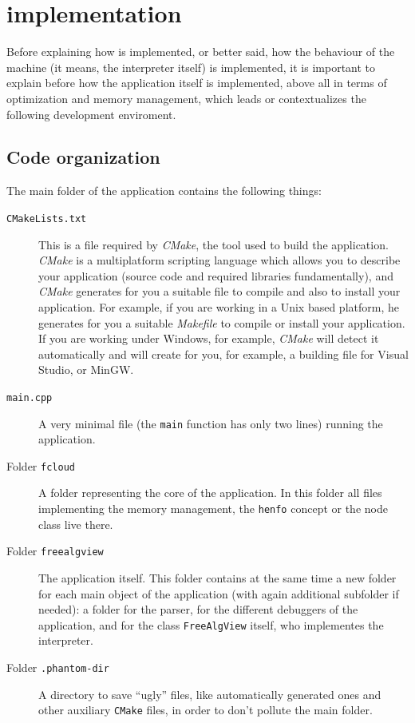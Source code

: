 \documentclass{article}
\begin{document}
\section{\fav implementation}
Before explaining how is \faupp implemented, or better said, how the behaviour
of the \faupp machine (it means, the interpreter itself) is implemented, it is
important to explain before how the application itself is implemented, above all
in terms of optimization and memory management, which leads or contextualizes
the following development enviroment.

\subsection{Code organization}
The main folder of the application contains the following things:

\begin{description}
  \item[\texttt{CMakeLists.txt}] This is a file required by \textit{CMake}, the tool used
    to build the application. \textit{CMake} is a multiplatform scripting language
    which allows you to describe your application (source code and required
    libraries fundamentally), and \textit{CMake} generates for you a suitable file
    to compile and also to install your application. For example, if you are
    working in a Unix based platform, he generates for you a suitable
    \textit{Makefile} to compile or install your application. If you are working
    under Windows, for example, \textit{CMake} will detect it automatically and
    will create for you, for example, a building file for Visual Studio, or
    MinGW.
  \item[\texttt{main.cpp}] A very minimal file (the \texttt{main} function has only two
    lines) running the application.
  \item[Folder \texttt{fcloud}] A folder representing the core of the
    application. In this folder all files implementing the memory management,
    the \texttt{henfo} concept or the node class live there.
  \item[Folder \texttt{freealgview}] The application itself. This folder
    contains at the same time a new folder for each main object of the
    application (with again additional subfolder if needed): a folder for the
    parser, for the different debuggers of the application, and for the class
    \texttt{FreeAlgView} itself, who implementes the \faupp interpreter.
  \item[Folder \texttt{.phantom-dir}] A directory to save ``ugly'' files, like
    automatically generated ones and other auxiliary \texttt{CMake} files, in
    order to don't pollute the main folder.
\end{description}
\end{document}
